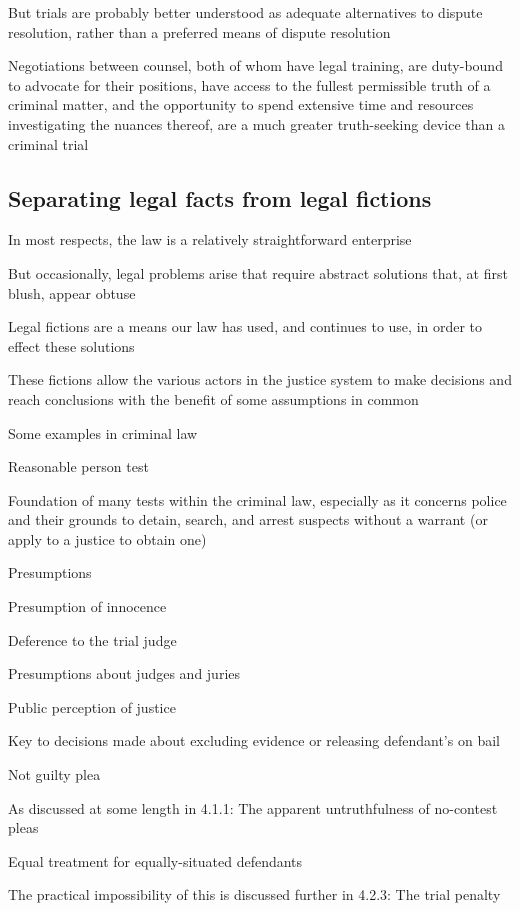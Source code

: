 But trials are probably better understood as adequate alternatives to dispute resolution, rather than a preferred means of dispute resolution

Negotiations between counsel, both of whom have legal training, are duty-bound to advocate for their positions, have access to the fullest permissible truth of a criminal matter, and the opportunity to spend extensive time and resources investigating the nuances thereof, are a much greater truth-seeking device than a criminal trial

\subsection{Separating legal facts from legal fictions}

In most respects, the law is a relatively straightforward enterprise

But occasionally, legal problems arise that require abstract solutions that, at first blush, appear obtuse

Legal fictions are a means our law has used, and continues to use, in order to effect these solutions

These fictions allow the various actors in the justice system to make decisions and reach conclusions with the benefit of some assumptions in common

Some examples in criminal law

Reasonable person test

Foundation of many tests within the criminal law, especially as it concerns police and their grounds to detain, search, and arrest suspects without a warrant (or apply to a justice to obtain one)

Presumptions

Presumption of innocence

Deference to the trial judge

Presumptions about judges and juries

Public perception of justice

Key to decisions made about excluding evidence or releasing defendant's on bail

Not guilty plea

As discussed at some length in 4.1.1: The apparent untruthfulness of no-contest pleas

Equal treatment for equally-situated defendants

The practical impossibility of this is discussed further in 4.2.3: The trial penalty


